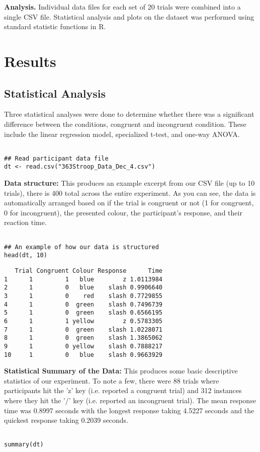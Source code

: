 \documentclass{article}
\begin{document}
\textbf{Analysis.} Individual data files for each set of 20 trials were combined into a single CSV file. Statistical analysis and plots on the dataset was performed using standard statistic functions in R. \\
\section{Results}
\label{sec:org78a6073}
\subsection{Statistical Analysis}
\label{sec:orgc7e4b5d}
\vspace{1em} Three statistical analyses were done to determine whether there was a significant difference between the conditions, congruent and incongruent condition. These include the linear regression model, specialized t-test, and one-way ANOVA.

\begin{verbatim}

## Read participant data file
dt <- read.csv("363Stroop_Data_Dec_4.csv")

\end{verbatim}

\textbf{Data structure:} This produces an example excerpt from our CSV file (up to 10 trials), there is 400 total across the entire experiment. As you can see, the data is automatically arranged based on if the trial is congruent or not (1 for congruent, 0 for incongruent), the presented colour, the participant's response, and their reaction time.
\begin{verbatim}

## An example of how our data is structured
head(dt, 10)
\end{verbatim}

\begin{verbatim}
   Trial Congruent Colour Response      Time
1      1         1   blue        z 1.0113984
2      1         0   blue    slash 0.9906640
3      1         0    red    slash 0.7729855
4      1         0  green    slash 0.7496739
5      1         0  green    slash 0.6566195
6      1         1 yellow        z 0.5783305
7      1         0  green    slash 1.0228071
8      1         0  green    slash 1.3865062
9      1         0 yellow    slash 0.7888217
10     1         0   blue    slash 0.9663929
\end{verbatim}

\vspace{2em} \textbf{Statistical Summary of the Data:} This produces some basic descriptive statistics of our experiment. To note a few, there were 88 trials where participants hit the 'z' key (i.e. reported a congruent trial) and 312 instances where they hit the '/' key (i.e. reported an incongruent trial). The mean response time was 0.8997 seconds with the longest response taking 4.5227 seconds and the quickest response taking 0.2039 seconds.
\begin{verbatim}

summary(dt)

\end{verbatim}
\end{document}
